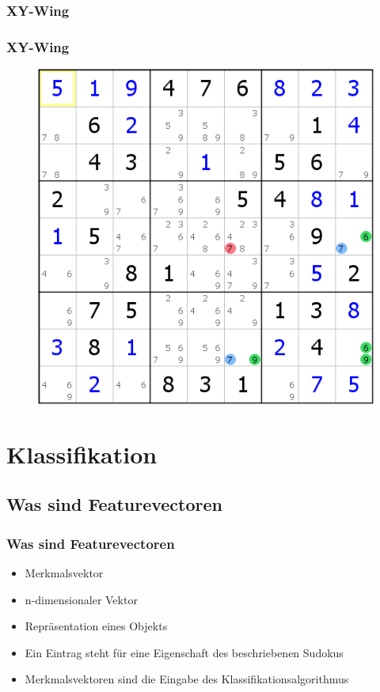 \documentclass[accentcolor=tud6b,colorbacktitle,inverttitle,landscape,german,presentation,t]{tudbeamer}
\begin{document}
		\subsubsection{XY-Wing}
			\begin{frame}
			\frametitle{XY-Wing}
			\begin{figure}[Hh]
    			\includegraphics[width=\textwidth,height=\textheight-10pt,keepaspectratio]{./img/XY_Wing.png}
			\end{figure}
			\end{frame}

\section{Klassifikation}
	\subsection{Was sind Featurevectoren}
		\begin{frame}
		\frametitle{Was sind Featurevectoren}
		\begin{itemize}
		\item Merkmalsvektor
		\item n-dimensionaler Vektor
		\item Repräsentation eines Objekts
		\item Ein Eintrag steht für eine Eigenschaft des beschriebenen Sudokus
		\item Merkmalsvektoren sind die Eingabe des Klassifikationsalgorithmus
		\end{itemize}
		\end{frame}
\end{document}
